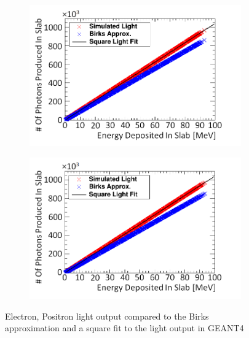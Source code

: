\begin{figure}[!h]
\centering
\begin{subfigure}{.5\textwidth}
  \centering
  \includegraphics[width=\linewidth]{Chapter4/Figs/Raster/electronSimulatedLightNew.png}
  \captionsetup{width=.9\linewidth}
  \caption{}
  \label{subFig:electron_light}
\end{subfigure}%
\begin{subfigure}{.5\textwidth}
  \centering
  \includegraphics[width=\linewidth]{Chapter4/Figs/Raster/positronSimulatedLightNew.png}
  \captionsetup{width=.9\linewidth}
  \caption{}
  \label{subFig:positron_light}
\end{subfigure}
\caption{Electron, Positron light output compared to the Birks approximation and a square fit to the light output in GEANT4}
\label{fig:electron_positron_light}
\end{figure}

